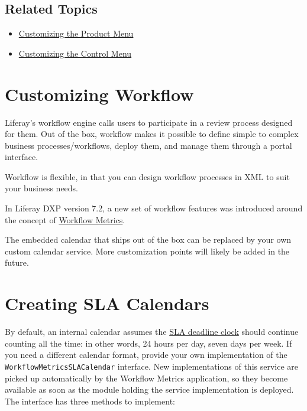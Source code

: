 \section{Related Topics}\label{related-topics-36}

\begin{itemize}
\tightlist
\item
  \href{/docs/7-2/customization/-/knowledge_base/c/customizing-the-product-menu}{Customizing
  the Product Menu}
\item
  \href{/docs/7-2/customization/-/knowledge_base/c/customizing-the-control-menu}{Customizing
  the Control Menu}
\end{itemize}

\chapter{Customizing Workflow}\label{customizing-workflow}

Liferay's workflow engine calls users to participate in a review process
designed for them. Out of the box, workflow makes it possible to define
simple to complex business processes/workflows, deploy them, and manage
them through a portal interface.

Workflow is flexible, in that you can design workflow processes in XML
to suit your business needs.

In Liferay DXP version 7.2, a new set of workflow features was
introduced around the concept of
\href{/docs/7-2/customization/-/knowledge_base/c/creating-sla-calendars}{Workflow
Metrics}.

The embedded calendar that ships out of the box can be replaced by your
own custom calendar service. More customization points will likely be
added in the future.

\chapter{Creating SLA Calendars}\label{creating-sla-calendars}

By default, an internal calendar assumes the
\href{/docs/7-2/customization/-/knowledge_base/c/creating-sla-calendars}{SLA
deadline clock} should continue counting all the time: in other words,
24 hours per day, seven days per week. If you need a different calendar
format, provide your own implementation of the
\texttt{WorkflowMetricsSLACalendar} interface. New implementations of
this service are picked up automatically by the Workflow Metrics
application, so they become available as soon as the module holding the
service implementation is deployed. The interface has three methods to
implement:

